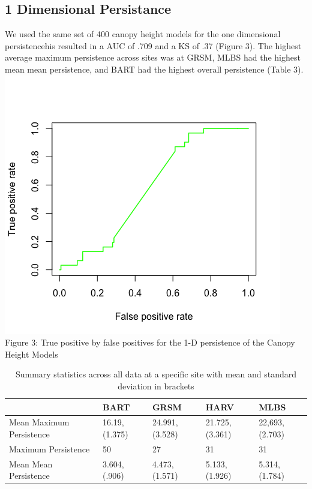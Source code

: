 \documentclass[10pt]{article}
\begin{document}
\subsection*{1 Dimensional Persistance}
We used the same set of 400 canopy height models for the one dimensional persistencehis resulted in a AUC of .709 and a KS of .37 (Figure 3). The highest average maximum persistence across sites was at GRSM, MLBS had the highest mean mean persistence, and BART had the highest overall persistence (Table 3).\\
\noindent \includegraphics[scale= 0.5]{AUC1d}\\
Figure 3: True positive by false positives for the 1-D persistence of the Canopy Height Models

\begin{table}[]
\centering
\caption{Summary statistics across all data at a specific site with mean and standard deviation in brackets}
\begin{tabular}{|l|l|l|l|l|}
\hline
                         & BART          & GRSM           & HARV          & MLBS          \\ \hline
Mean Maximum Persistence & 16.19,(1.375) & 24.991,(3.528)  & 21.725,(3.361) & 22,693,(2.703) \\ \hline
Maximum Persistence      & 50            & 27             & 31            & 31            \\ \hline
Mean Mean Persistence    & 3.604,(.906) & 4.473,(1.571) & 5.133,(1.926) & 5.314,(1.784) \\ \hline
\end{tabular}
\end{table}
\end{document}
